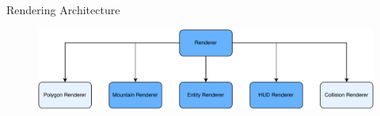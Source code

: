 
\begin{frame}{Rendering Architecture}
    \centering


    \begin{figure}
        \centering
        \includegraphics[scale=0.50]{../figures/Renderer.pdf}
    \end{figure} 
\end{frame}

